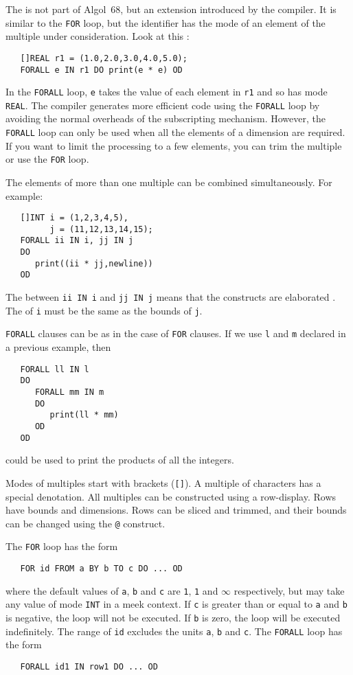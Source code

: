 The  is
not part of Algol~68, but an extension introduced by the
 compiler. It is similar to
the \verb|FOR| loop, but the identifier has the mode of an element of
the multiple under consideration.  Look at this
:
\begin{verbatim}
   []REAL r1 = (1.0,2.0,3.0,4.0,5.0);
   FORALL e IN r1 DO print(e * e) OD
\end{verbatim}
\noindent
In the \verb|FORALL| loop, \verb|e| takes the value of each element
in \verb|r1| and so has mode \verb|REAL|. The compiler generates more
efficient code using the \verb|FORALL| loop by avoiding the normal
overheads of the subscripting mechanism. However, the \verb|FORALL|
loop can only be used when all the elements of a dimension are
required. If you want to limit the processing to a few elements, you
can trim the multiple or use the \verb|FOR| loop.

The elements of more than one multiple can be combined
simultaneously. For example:
\begin{verbatim}
   []INT i = (1,2,3,4,5),
         j = (11,12,13,14,15);
   FORALL ii IN i, jj IN j
   DO
      print((ii * jj,newline))
   OD
\end{verbatim}
\noindent
The  between \verb|ii IN i| and
\verb|jj IN j| means that the constructs are elaborated
.  The  of
\verb|i| must be the same as the bounds of \verb|j|.

\verb|FORALL| clauses can be  as in the case of \verb|FOR|
clauses. If we use \verb|l| and \verb|m| declared in a previous
example, then
\begin{verbatim}
   FORALL ll IN l
   DO
      FORALL mm IN m
      DO
         print(ll * mm)
      OD
   OD
\end{verbatim}
\noindent
could be used to print the products of all the integers.

Modes of multiples start with brackets (\verb|[]|). A multiple of
characters has a special denotation. All multiples can be constructed
using a row-display. Rows have bounds and dimensions. Rows can be
sliced and trimmed, and their bounds can be changed using the
\verb|@| construct.

The \verb|FOR| loop has the form
\begin{verbatim}
   FOR id FROM a BY b TO c DO ... OD
\end{verbatim}
\noindent
where the default values of \verb|a|, \verb|b| and \verb|c| are
\verb|1|, \verb|1| and $\infty$ respectively, but may take any value
of mode \verb|INT| in a meek context. If \verb|c| is greater than or
equal to \verb|a| and \verb|b| is negative, the loop will not be
executed. If \verb|b| is zero, the loop will be executed
indefinitely. The range of \verb|id| excludes the units \verb|a|,
\verb|b| and \verb|c|.  The \verb|FORALL| loop has the form
\begin{verbatim}
   FORALL id1 IN row1 DO ... OD
\end{verbatim}

